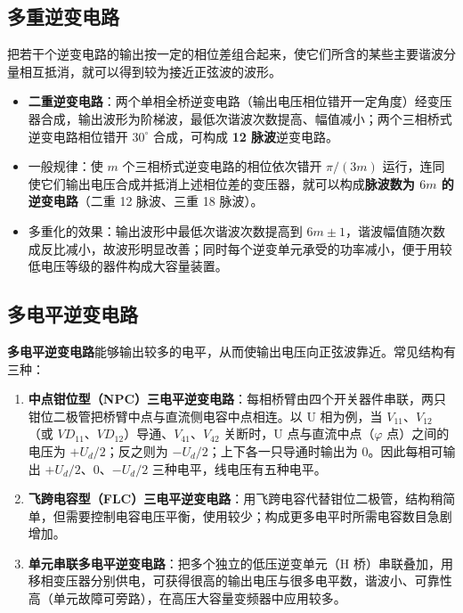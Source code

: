\subsection{多重逆变电路}

把若干个逆变电路的输出按一定的相位差组合起来，使它们所含的某些主要谐波分量相互抵消，就可以得到较为接近正弦波的波形。

\begin{itemize}
  \item \textbf{二重逆变电路}：两个单相全桥逆变电路（输出电压相位错开一定角度）经变压器合成，输出波形为阶梯波，最低次谐波次数提高、幅值减小；两个三相桥式逆变电路相位错开 $30^\circ$ 合成，可构成 \textbf{12 脉波}逆变电路。
  \item 一般规律：使 $m$ 个三相桥式逆变电路的相位依次错开 $\pi/(3m)$ 运行，连同使它们输出电压合成并抵消上述相位差的变压器，就可以构成\textbf{脉波数为 $6m$ 的逆变电路}（二重 12 脉波、三重 18 脉波）。
  \item 多重化的效果：输出波形中最低次谐波次数提高到 $6m\pm1$，谐波幅值随次数成反比减小，故波形明显改善；同时每个逆变单元承受的功率减小，便于用较低电压等级的器件构成大容量装置。
\end{itemize}

\subsection{多电平逆变电路}

\textbf{多电平逆变电路}能够输出较多的电平，从而使输出电压向正弦波靠近。常见结构有三种：

\begin{enumerate}
  \item \textbf{中点钳位型（NPC）三电平逆变电路}：每相桥臂由四个开关器件串联，两只钳位二极管把桥臂中点与直流侧电容中点相连。以 U 相为例，当 $V_{11}$、$V_{12}$（或 $VD_{11}$、$VD_{12}$）导通、$V_{41}$、$V_{42}$ 关断时，U 点与直流中点（$\varphi$ 点）之间的电压为 $+U_d/2$；反之则为 $-U_d/2$；上下各一只导通时输出为 0。因此每相可输出 $+U_d/2$、$0$、$-U_d/2$ 三种电平，线电压有五种电平。
  \item \textbf{飞跨电容型（FLC）三电平逆变电路}：用飞跨电容代替钳位二极管，结构稍简单，但需要控制电容电压平衡，使用较少；构成更多电平时所需电容数目急剧增加。
  \item \textbf{单元串联多电平逆变电路}：把多个独立的低压逆变单元（H 桥）串联叠加，用移相变压器分别供电，可获得很高的输出电压与很多电平数，谐波小、可靠性高（单元故障可旁路），在高压大容量变频器中应用较多。
\end{enumerate}


